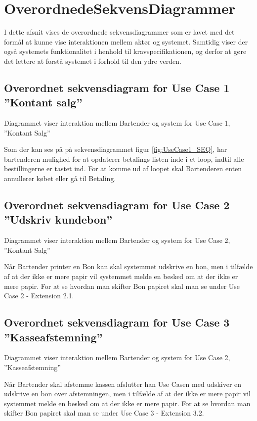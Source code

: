 
\section{OverordnedeSekvensDiagrammer}
I dette afsnit vises de overordnede sekvensdiagrammer som er lavet med det formål at kunne vise interaktionen mellem aktør og systemet. Samtidig viser der også systemets funktionalitet i henhold til kravspecifikationen, og derfor at gøre det lettere at forstå systemet i forhold til den ydre verden. 


\subsection{Overordnet sekvensdiagram for Use Case 1 ''Kontant salg''}
Diagrammet viser interaktion mellem Bartender og system for Use Case 1, ''Kontant Salg'' 


Som der kan ses på på sekvensdiagrammet figur \ref{fig:UseCase1_SEQ}, har bartenderen mulighed for at opdaterer betalings listen inde i et loop, indtil alle bestillingerne er tastet ind. For at komme ud af loopet skal Bartenderen enten annullerer købet eller gå til Betaling. 


\subsection{Overordnet sekvensdiagram for Use Case 2 ''Udskriv kundebon''}
Diagrammet viser interaktion mellem Bartender og system for Use Case 2, ''Kontant Salg'' 


Når Bartender printer en Bon kan skal systemmet udskrive en bon, men i tilfælde af at der ikke er mere papir vil systemmet melde en besked om at der ikke er mere papir.
\newline\newline
For at se hvordan man skifter Bon papiret skal man se under Use Case 2 - Extension 2.1.



\subsection{Overordnet sekvensdiagram for Use Case 3 ''Kasseafstemning''}
Diagrammet viser interaktion mellem Bartender og system for Use Case 2, ''Kasseafstemning'' 


Når Bartender skal afstemme kassen afslutter han Use Casen med udskiver en udskrive en bon over afstemningen, men i tilfælde af at der ikke er mere papir vil systemmet melde en besked om at der ikke er mere papir.
\newline\newline
For at se hvordan man skifter Bon papiret skal man se under Use Case 3 - Extension 3.2.